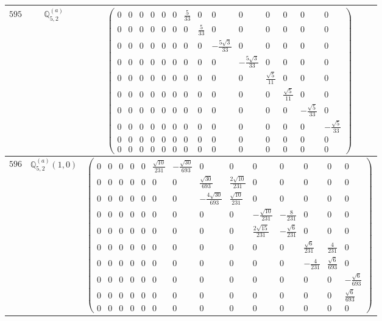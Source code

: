 \documentclass[fleqn,8pt,landscape]{jsarticle}
\begin{document}
\begin{center}
\begin{longtable}{ccc}
$ 595 $ & $ \mathbb{Q}_{5,2}^{(a)} $ & $ \begin{pmatrix} 0 & 0 & 0 & 0 & 0 & 0 & \frac{5}{33} & 0 & 0 & 0 & 0 & 0 & 0 & 0 \\ 0 & 0 & 0 & 0 & 0 & 0 & 0 & \frac{5}{33} & 0 & 0 & 0 & 0 & 0 & 0 \\ 0 & 0 & 0 & 0 & 0 & 0 & 0 & 0 & - \frac{5 \sqrt{3}}{33} & 0 & 0 & 0 & 0 & 0 \\ 0 & 0 & 0 & 0 & 0 & 0 & 0 & 0 & 0 & - \frac{5 \sqrt{3}}{33} & 0 & 0 & 0 & 0 \\ 0 & 0 & 0 & 0 & 0 & 0 & 0 & 0 & 0 & 0 & \frac{\sqrt{5}}{11} & 0 & 0 & 0 \\ 0 & 0 & 0 & 0 & 0 & 0 & 0 & 0 & 0 & 0 & 0 & \frac{\sqrt{5}}{11} & 0 & 0 \\ 0 & 0 & 0 & 0 & 0 & 0 & 0 & 0 & 0 & 0 & 0 & 0 & - \frac{\sqrt{5}}{33} & 0 \\ 0 & 0 & 0 & 0 & 0 & 0 & 0 & 0 & 0 & 0 & 0 & 0 & 0 & - \frac{\sqrt{5}}{33} \\ 0 & 0 & 0 & 0 & 0 & 0 & 0 & 0 & 0 & 0 & 0 & 0 & 0 & 0 \\ 0 & 0 & 0 & 0 & 0 & 0 & 0 & 0 & 0 & 0 & 0 & 0 & 0 & 0 \end{pmatrix} $ \\ \hline
$ 596 $ & $ \mathbb{Q}_{5,2}^{(a)}(1,0) $ & $ \begin{pmatrix} 0 & 0 & 0 & 0 & 0 & \frac{\sqrt{10}}{231} & - \frac{\sqrt{30}}{693} & 0 & 0 & 0 & 0 & 0 & 0 & 0 \\ 0 & 0 & 0 & 0 & 0 & 0 & 0 & \frac{\sqrt{30}}{693} & \frac{2 \sqrt{10}}{231} & 0 & 0 & 0 & 0 & 0 \\ 0 & 0 & 0 & 0 & 0 & 0 & 0 & - \frac{4 \sqrt{30}}{693} & \frac{\sqrt{10}}{231} & 0 & 0 & 0 & 0 & 0 \\ 0 & 0 & 0 & 0 & 0 & 0 & 0 & 0 & 0 & - \frac{\sqrt{10}}{231} & - \frac{8}{231} & 0 & 0 & 0 \\ 0 & 0 & 0 & 0 & 0 & 0 & 0 & 0 & 0 & \frac{2 \sqrt{15}}{231} & - \frac{\sqrt{6}}{231} & 0 & 0 & 0 \\ 0 & 0 & 0 & 0 & 0 & 0 & 0 & 0 & 0 & 0 & 0 & \frac{\sqrt{6}}{231} & \frac{4}{231} & 0 \\ 0 & 0 & 0 & 0 & 0 & 0 & 0 & 0 & 0 & 0 & 0 & - \frac{4}{231} & \frac{\sqrt{6}}{693} & 0 \\ 0 & 0 & 0 & 0 & 0 & 0 & 0 & 0 & 0 & 0 & 0 & 0 & 0 & - \frac{\sqrt{6}}{693} \\ 0 & 0 & 0 & 0 & 0 & 0 & 0 & 0 & 0 & 0 & 0 & 0 & 0 & \frac{\sqrt{6}}{693} \\ 0 & 0 & 0 & 0 & 0 & 0 & 0 & 0 & 0 & 0 & 0 & 0 & 0 & 0 \end{pmatrix} $ \\ \hline

\end{longtable}
\end{center}
\end{document}
